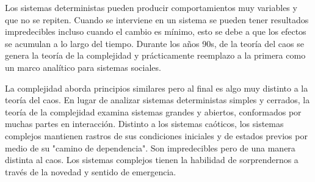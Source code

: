 \documentclass{article} %
\begin{document}
\vspace{0.5 cm}

Los sistemas deterministas pueden producir comportamientos muy variables y que no se repiten. Cuando se interviene en un sistema se pueden tener resultados impredecibles incluso cuando el cambio es mínimo, esto se debe a que los efectos se acumulan a lo largo del tiempo. Durante los años 90s, de la teoría del caos se genera la teoría de la complejidad y prácticamente reemplazo a la primera como un marco analítico para sistemas sociales.  

\vspace{0.5 cm}

La complejidad aborda principios similares pero al final es algo muy distinto a la teoría del caos. En lugar de analizar sistemas deterministas simples y cerrados, la teoría de la complejidad examina sistemas grandes y abiertos, conformados por muchas partes en interacción. Distinto a los sistemas caóticos, los sistemas complejos mantienen rastros de sus condiciones iniciales y de estados previos por medio de su "camino de dependencia". Son impredecibles pero de una manera distinta al caos. Los sistemas complejos tienen la habilidad de sorprendernos a través de la novedad y sentido de emergencia. 
\end{document}
